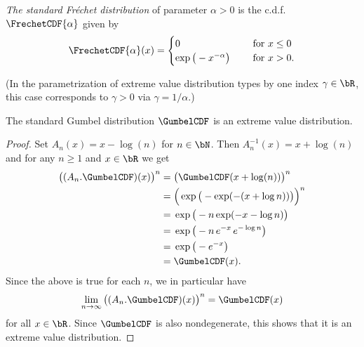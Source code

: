 \begin{definition}
  \label{def:std-Frechet-cdf}
  \emph{The standard Fr\'echet distribution} of parameter $\alpha > 0$
  is the c.d.f. $\FrechetCDF{\alpha}$ given by
  \begin{align*}
  \FrechetCDF{\alpha} (x) = \begin{cases}
    0 \quad & \text{ for } x \le 0 \\
    \exp \big( - x^{-\alpha} \big) \quad & \text{ for } x > 0 .
    \end{cases}
  \end{align*}

  (In the parametrization of extreme value distribution types by one
  index $\gamma \in \bR$, this case corresponds to $\gamma > 0$
  via $\gamma = 1/\alpha$.)
\end{definition}

\begin{theorem}
  \label{thm:Gumbel-is-extr-val-distr}
  \leanok
  The standard Gumbel distribution $\GumbelCDF$ is an extreme value
  distribution.
\end{theorem}
\begin{proof}
  Set $A_n(x) = x - \log(n)$ for $n \in \bN$. Then
  $A_n^{-1}(x) = x + \log(n)$ and for any $n \ge 1$ and $x \in \bR$ we get
  \begin{align*}
    \big( (A_n . \GumbelCDF)(x) \big)^n
    = \; & \big( \GumbelCDF(x + \log(n)) \big)^n \\
    = \; & \Big( \exp \big( - \exp(-(x + \log n)) \big) \Big)^n \\
    = \; & \exp \big( - n \exp(-x - \log n) \big) \\
    = \; & \exp \big( - n \, e^{-x} \, e^{-\log n}  \big) \\
    = \; & \exp \big( - e^{-x} \big) \\
    = \; & \GumbelCDF(x) .
  \end{align*}
  Since the above is true for each $n$, we in particular have
  \begin{align*}
    \lim_{n \to \infty} \big( (A_n . \GumbelCDF)(x) \big)^n
    = \GumbelCDF(x)
  \end{align*}
  for all $x \in \bR$. Since $\GumbelCDF$ is also nondegenerate,
  this shows that it is an extreme value distribution.
\end{proof}


